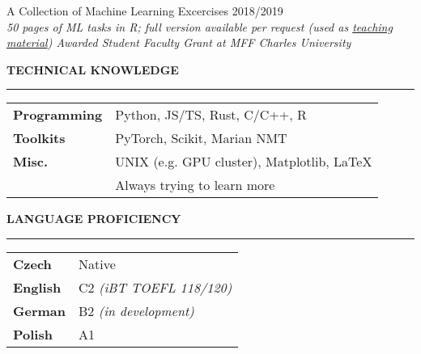 \documentclass[11pt,a4paper]{article} %
\newcommand{\hSection}[1]{
    \medskip
    \MakeUppercase{\bf #1}
    \medskip
    \hrule
}
\newcommand{\hSubsectionB}[3]{
    {#1} \hfill {\footnotesize #2}\hspace{-1cm}\\
    \vspace{-0.2cm} \hspace{-0.17cm}\textit{\footnotesize #3}
    \vspace{0.05cm}
}
\begin{document}
\hSubsectionB
{A Collection of Machine Learning Excercises}
{2018/2019}
{
\hspace{-0.1cm}50 pages of ML tasks in R; full version available per request (used as \href{http://ufal.mff.cuni.cz/courses/npfl054}{teaching material}) \vspace{0.1cm}\newline
\vspace{-0.2cm}\hspace{-0.01cm}Awarded Student Faculty Grant at MFF Charles University
}



\vspace{0.1\baselineskip}
\begin{minipage}{.62\textwidth}
    \hSection{Technical Knowledge}
    \hspace{-0.3cm}
    \begin{minipage}{\textwidth}
        \vspace{0.15cm}
        \begin{tabular}{ p{2.4cm} l}
        {\bf Programming} & Python, JS/TS, Rust, C/C++, R \\
        {\bf Toolkits} & PyTorch, Scikit, Marian NMT \\
        {\bf Misc.} & UNIX {\small (e.g. GPU cluster)}, Matplotlib, LaTeX \\
        & Always trying to learn more
        \end{tabular}
    \end{minipage}
\end{minipage}
\begin{minipage}{.38\textwidth}
    \hSection{Language Proficiency}
    \hspace{-0.3cm}
    \begin{minipage}{\textwidth}
        \vspace{0.15cm}
        \begin{tabular}{ p{1.3cm} l}
        {\bf Czech} & Native \\
        {\bf English} & C2 \textit{\footnotesize (iBT TOEFL 118/120)} \\
        {\bf German} & B2 \textit{\footnotesize (in development)} \\
        {\bf Polish} & A1
        \end{tabular}
    \end{minipage}
\end{minipage}
\end{document}
